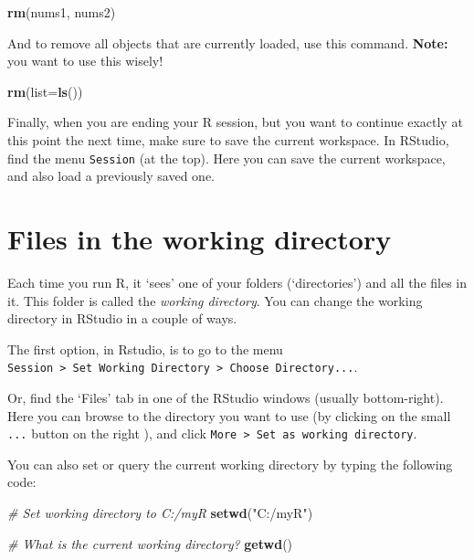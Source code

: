 \documentclass[]{book}
\newenvironment{Shaded}{\begin{snugshade}}{\end{snugshade}}
\newcommand{\CommentTok}[1]{\textcolor[rgb]{0.56,0.35,0.01}{\textit{#1}}}
\newcommand{\DataTypeTok}[1]{\textcolor[rgb]{0.13,0.29,0.53}{#1}}
\newcommand{\KeywordTok}[1]{\textcolor[rgb]{0.13,0.29,0.53}{\textbf{#1}}}
\newcommand{\NormalTok}[1]{#1}
\newcommand{\StringTok}[1]{\textcolor[rgb]{0.31,0.60,0.02}{#1}}
\begin{document}
\begin{Shaded}
\begin{Highlighting}[]
\KeywordTok{rm}\NormalTok{(nums1, nums2)}
\end{Highlighting}
\end{Shaded}

And to remove all objects that are currently loaded, use this command. \textbf{Note:} you want to use this wisely!

\begin{Shaded}
\begin{Highlighting}[]
\KeywordTok{rm}\NormalTok{(}\DataTypeTok{list=}\KeywordTok{ls}\NormalTok{())}
\end{Highlighting}
\end{Shaded}

Finally, when you are ending your R session, but you want to continue exactly at this point the next time, make sure to save the current workspace. In RStudio, find the menu \texttt{Session} (at the top). Here you can save the current workspace, and also load a previously saved one.

\hypertarget{fileswd}{%
\section{Files in the working directory}\label{fileswd}}

Each time you run R, it `sees' one of your folders (`directories') and all the files in it. This folder is called the \emph{working directory}. You can change the working directory in RStudio in a couple of ways.

The first option, in Rstudio, is to go to the menu \texttt{Session\ \textgreater{}\ Set\ Working\ Directory\ \textgreater{}\ Choose\ Directory...}.

Or, find the `Files' tab in one of the RStudio windows (usually bottom-right). Here you can browse to the directory you want to use (by clicking on the small \texttt{...} button on the right ), and click \texttt{More\ \textgreater{}\ Set\ as\ working\ directory}.

You can also set or query the current working directory by typing the following code:

\begin{Shaded}
\begin{Highlighting}[]
\CommentTok{# Set working directory to C:/myR}
\KeywordTok{setwd}\NormalTok{(}\StringTok{"C:/myR"}\NormalTok{)}

\CommentTok{# What is the current working directory?}
\KeywordTok{getwd}\NormalTok{()}
\end{Highlighting}
\end{Shaded}
\end{document}
